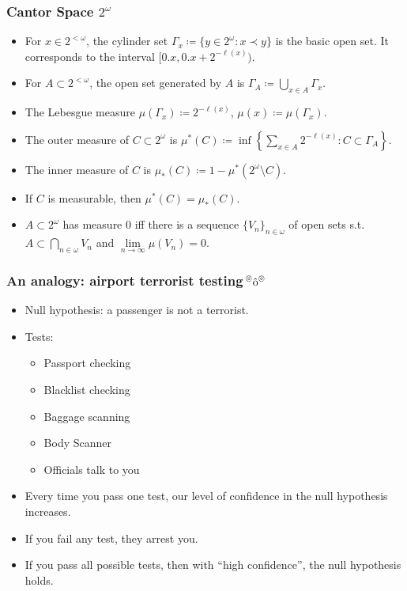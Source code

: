 \documentclass[UTF8,11pt,colorlinks,compress,openany]{beamer}%
\begin{document}
\begin{frame}\frametitle{Cantor Space $2^\omega$}
\begin{itemize}
	\item For $x\in 2^{<\omega}$, the cylinder set $\Gamma_x\coloneqq \{y\in 2^\omega: x\prec y\}$ is the basic open set. It corresponds to the interval $[0.x,0.x+2^{-\ell(x)})$.
	\item For $A\subset 2^{<\omega}$, the open set generated by $A$ is $\Gamma_A\coloneqq \bigcup\limits_{x\in A}\Gamma_x$.
	\item The Lebesgue measure $\mu(\Gamma_x)\coloneqq 2^{-\ell(x)}$, $\mu(x)\coloneqq \mu(\Gamma_x)$.
	\item The outer measure of $C\subset 2^\omega$ is $\mu^*(C)\coloneqq \inf\left\{\sum\limits_{x\in A}2^{-\ell(x)}: C\subset\Gamma_A\right\}$.
	\item The inner measure of $C$ is $\mu_*(C)\coloneqq 1-\mu^*(2^\omega\setminus C)$.
	\item If $C$ is measurable, then $\mu^*(C)=\mu_*(C)$.
	\item $A\subset 2^\omega$ has measure $0$ iff there is a sequence $\{V_n\}_{n\in\omega}$ of open sets s.t. $A\subset\bigcap\limits_{n\in\omega}V_n$ and $\lim\limits_{n\to\infty}\mu(V_n)=0$.
\end{itemize}
\end{frame}

\begin{frame}\frametitle{An analogy: airport terrorist testing$\sideset{^\circledcirc}{^\circledcirc}{\operatorname{\hat{o}}}$}
\begin{itemize}
	\item Null hypothesis: a passenger is not a terrorist.
	\item Tests:
	\begin{itemize}
		\item Passport checking
		\item Blacklist checking
		\item Baggage scanning
		\item Body Scanner
		\item Officials talk to you
	\end{itemize}
	\item Every time you pass one test, our level of confidence in the null hypothesis increases.
	\item If you fail any test, they arrest you.
	\item If you pass all possible tests, then with ``high confidence'', the null hypothesis holds.
\end{itemize}
\end{frame}
\end{document}
